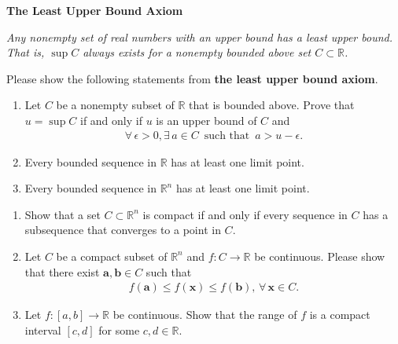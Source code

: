 \documentclass[11pt,letter,notitlepage]{article}
\theoremstyle{definition}
\begin{document}
		\begin{exercise}
			\textbf{The Least Upper Bound Axiom}
			
			
			\emph{Any nonempty set of real numbers with an upper bound has a least upper bound. That is, $\sup  C$ always exists for a nonempty bounded above set $C \subset \mathbb{R}$.}
			
			Please show the following statements from \textbf{the least upper bound axiom}.
			\begin{enumerate}
				\item Let $C$ be a nonempty subset of $\mathbb{R}$ that is bounded above. Prove that $u = \sup C$ if and only if $u$ is an upper bound of $C$ and
				\begin{align*}
					\forall\,\epsilon>0,\exists\,a \in C\,\text{ such that }\,a>u-\epsilon.
				\end{align*}
				\item  Every bounded sequence in $\mathbb{R}$ has at least one limit point.
				\item Every bounded sequence in $\mathbb{R}^n$ has at least one limit point.
			\end{enumerate}
		\end{exercise}
		\begin{solution}
			
		\end{solution}
		
		
		\newpage
		
		
		
		\begin{exercise}
			\begin{enumerate}
				\item Show that a set $C \subset \mathbb{R}^n$ is compact if and only if every sequence in $C$ has a subsequence that converges to a point in $C$.
				\item Let $C$ be a compact subset of $\mathbb{R}^n$ and $f:C \rightarrow \mathbb{R}$ be continuous. Please show that there exist $\mathbf{a},\mathbf{b} \in C$ such that
				\begin{align*}
					f(\mathbf{a}) \leq f(\mathbf{x}) \leq f(\mathbf{b}),\,\forall\,\mathbf{x}\in C.
				\end{align*}
				\item Let $f: \left[ a,b \right] \rightarrow\mathbb{R}$ be continuous. Show that the range of $f$ is a compact interval $\left[c,d \right]$ for some $c,d \in \mathbb{R}$.
			\end{enumerate}
		\end{exercise}
		\begin{solution}
			
		\end{solution}
		
\end{document}
